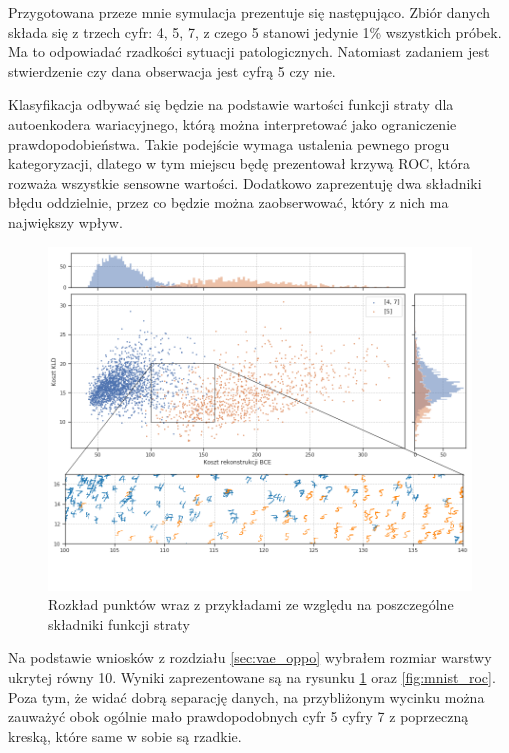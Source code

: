 Przygotowana przeze mnie symulacja prezentuje się następująco. Zbiór danych składa się z trzech cyfr: 4, 5, 7, z czego 5 stanowi jedynie 1\% wszystkich próbek. Ma to odpowiadać rzadkości sytuacji patologicznych. Natomiast zadaniem jest stwierdzenie czy dana obserwacja jest cyfrą 5 czy nie.

Klasyfikacja odbywać się będzie na podstawie wartości funkcji straty dla autoenkodera wariacyjnego, którą można interpretować jako ograniczenie prawdopodobieństwa. Takie podejście wymaga ustalenia pewnego progu kategoryzacji, dlatego w tym miejscu będę prezentował krzywą ROC, która rozważa wszystkie sensowne wartości. Dodatkowo zaprezentuję dwa składniki błędu oddzielnie, przez co będzie można zaobserwować, który z nich ma największy wpływ.

\begin{figure}[h!]
    \centering
    \includegraphics[width=1.0\textwidth]{images/mnist_complex}
    \caption{Rozkład punktów wraz z przykładami ze względu na poszczególne składniki funkcji straty}
    \label{fig:mnist_compare}
\end{figure}

Na podstawie wniosków z rozdziału \ref{sec:vae_oppo} wybrałem rozmiar warstwy ukrytej równy 10. Wyniki zaprezentowane są na rysunku \ref{fig:mnist_compare} oraz \ref{fig:mnist_roc}. Poza tym, że widać dobrą separację danych, na przybliżonym wycinku można zauważyć obok ogólnie mało prawdopodobnych cyfr 5 cyfry 7 z poprzeczną kreską, które same w sobie są rzadkie.


